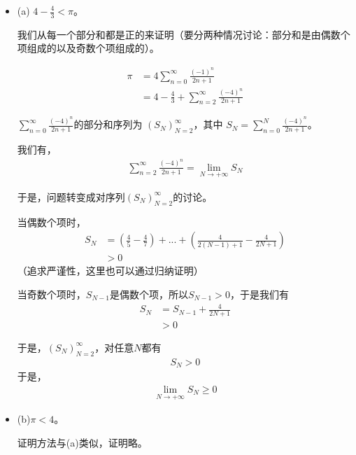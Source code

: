 \documentclass{article}
\begin{document}
\begin{itemize}
  \item (a) $4 - \frac{4}{3} < \pi$。

        我们从每一个部分和都是正的来证明（要分两种情况讨论：部分和是由偶数个项组成的以及奇数个项组成的）。

        \begin{align*}
          \pi & = 4\sum\limits_{n = 0}^\infty \frac{(-1)^n}{2n +1}                  \\
              & = 4 - \frac{4}{3} + \sum\limits_{n = 2}^\infty \frac{(-4)^n}{2n +1}
        \end{align*}

        $\sum\limits_{n = 0}^\infty \frac{(-4)^n}{2n +1}$的部分和序列为
        $(S_N)_{N = 2}^\infty$，其中
        $S_N = \sum\limits_{n = 0}^{N} \frac{(-4)^n}{2n +1}$。

        我们有，
        \begin{align*}
          \sum\limits_{n = 2}^\infty \frac{(-4)^n}{2n +1} = \lim\limits_{N \to +\infty} S_N
        \end{align*}

        于是，问题转变成对序列$(S_N)_{N = 2}^\infty$的讨论。

        当偶数个项时，
        \begin{align*}
          S_N & = (\frac{4}{5} - \frac{4}{7}) + ... + (\frac{4}{2(N-1) + 1} - \frac{4}{2N + 1}) \\
              & > 0
        \end{align*}
        （追求严谨性，这里也可以通过归纳证明）

        当奇数个项时，$S_{N - 1}$是偶数个项，所以$S_{N - 1} > 0$，于是我们有
        \begin{align*}
          S_N & = S_{N - 1} + \frac{4}{2N + 1} \\
              & > 0
        \end{align*}

        于是，$(S_N)_{N = 2}^\infty$，对任意$N$都有
        \begin{align*}
          S_N > 0
        \end{align*}
        于是，
        \begin{align*}
          \lim\limits_{N \to +\infty} S_N \geq 0
        \end{align*}

  \item (b)$\pi < 4$。

        证明方法与(a)类似，证明略。

\end{itemize}
\end{document}

